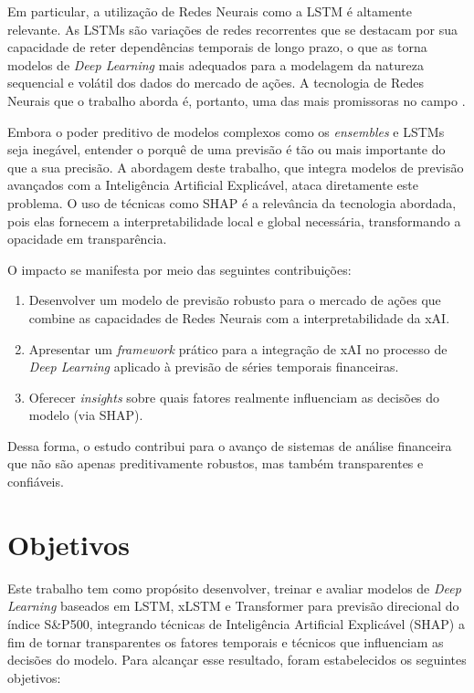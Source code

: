 Em particular, a utilização de Redes Neurais como a LSTM é altamente relevante. As LSTMs são variações de redes recorrentes que se destacam por sua capacidade de reter dependências temporais de longo prazo, o que as torna modelos de \textit{Deep Learning} mais adequados para a modelagem da natureza sequencial e volátil dos dados do mercado de ações. A tecnologia de Redes Neurais que o trabalho aborda é, portanto, uma das mais promissoras no campo \cite{Gupta2025Interpretable}.

Embora o poder preditivo de modelos complexos como os \textit{ensembles} e LSTMs seja inegável, entender o porquê de uma previsão é tão ou mais importante do que a sua precisão. A abordagem deste trabalho, que integra modelos de previsão avançados com a Inteligência Artificial Explicável, ataca diretamente este problema. O uso de técnicas como SHAP é a relevância da tecnologia abordada, pois elas fornecem a interpretabilidade local e global necessária, transformando a opacidade em transparência. \cite{Benhamou2021XAIPlanning}

O impacto se manifesta por meio das seguintes contribuições:
\begin{enumerate}
    \item Desenvolver um modelo de previsão robusto para o mercado de ações que combine as capacidades de Redes Neurais com a interpretabilidade da xAI.
    \item Apresentar um \textit{framework} prático para a integração de xAI no processo de \textit{Deep Learning} aplicado à previsão de séries temporais financeiras.
    \item Oferecer \textit{insights} sobre quais fatores realmente influenciam as decisões do modelo (via SHAP).
\end{enumerate}

Dessa forma, o estudo contribui para o avanço de sistemas de análise financeira que não são apenas preditivamente robustos, mas também transparentes e confiáveis.

\section{Objetivos}

Este trabalho tem como propósito desenvolver, treinar e avaliar modelos de \textit{Deep Learning} baseados em LSTM, xLSTM e Transformer para previsão direcional do índice S\&P500, integrando técnicas de Inteligência Artificial Explicável (SHAP) a fim de tornar transparentes os fatores temporais e técnicos que influenciam as decisões do modelo. Para alcançar esse resultado, foram estabelecidos os seguintes objetivos:

